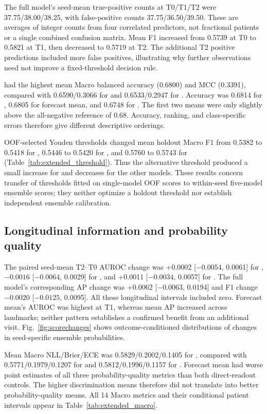 The full model's seed-mean true-positive counts at T0/T1/T2 were 37.75/38.00/38.25, with false-positive counts 37.75/36.50/39.50. These are averages of integer counts from four correlated predictors, not fractional patients or a single combined confusion matrix. Mean F1 increased from 0.5739 at T0 to 0.5821 at T1, then decreased to 0.5719 at T2. The additional T2 positive predictions included more false positives, illustrating why further observations need not improve a fixed-threshold decision rule.

\fullmodel{} had the highest mean Macro balanced accuracy (0.6800) and MCC (0.3391), compared with 0.6590/0.3066 for \direct{} and 0.6533/0.2947 for \nojepa{}. Accuracy was 0.6814 for \direct{}, 0.6805 for forecast mean, and 0.6748 for \nojepa{}. The first two means were only slightly above the all-negative reference of 0.68. Accuracy, ranking, and class-specific errors therefore give different descriptive orderings.

OOF-selected Youden thresholds changed mean holdout Macro F1 from 0.5382 to 0.5418 for \nojepa{}, 0.5446 to 0.5420 for \direct{}, and 0.5760 to 0.5743 for \fullmodel{} (Table~\ref{tab:extended_threshold}). Thus the alternative threshold produced a small increase for \nojepa{} and decreases for the other models. These results concern transfer of thresholds fitted on single-model OOF scores to within-seed five-model ensemble scores; they neither optimize a holdout threshold nor establish independent ensemble calibration.

\subsection{Longitudinal information and probability quality}
The paired seed-mean T2--T0 AUROC change was +0.0002 [$-0.0054$, 0.0061] for \fullmodel{}, $-0.0016$ [$-0.0064$, 0.0029] for \nojepa{}, and +0.0011 [$-0.0034$, 0.0057] for \direct{}. The full model's corresponding AP change was +0.0062 [$-0.0063$, 0.0194] and F1 change $-0.0020$ [$-0.0125$, 0.0095]. All these longitudinal intervals included zero. Forecast mean's AUROC was highest at T1, whereas mean AP increased across landmarks; neither pattern establishes a confirmed benefit from an additional visit. Fig.~\ref{fig:scorechanges} shows outcome-conditioned distributions of changes in seed-specific ensemble probabilities.


Mean Macro NLL/Brier/ECE was 0.5829/0.2002/0.1405 for \fullmodel{}, compared with 0.5771/0.1979/0.1207 for \direct{} and 0.5812/0.1996/0.1157 for \nojepa{}. Forecast mean had worse point estimates of all three probability-quality metrics than both direct-readout controls. The higher discrimination means therefore did not translate into better probability-quality means. All 14 Macro metrics and their conditional patient intervals appear in Table~\ref{tab:extended_macro}.

